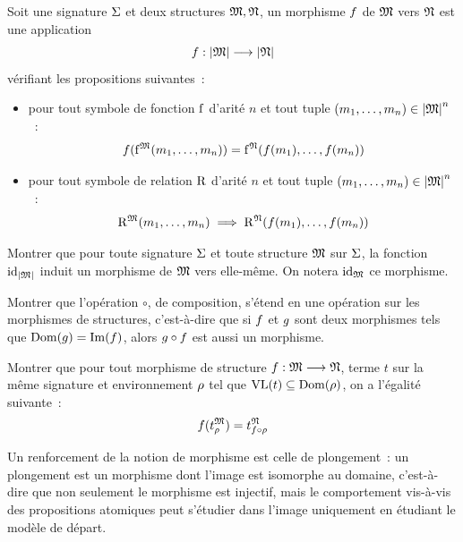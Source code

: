 \begin{definition}
  Soit une signature $\Sigma$ et deux structures $\mathfrak{M},\mathfrak{N}$, un
  morphisme $f$ de $\mathfrak{M}$ vers $\mathfrak{N}$ est une application
  \[f : \displaystyle \left\vert \mathfrak{M}\right\vert \longrightarrow \left\vert \mathfrak{N}\right\vert\]
  vérifiant les propositions suivantes~:
  \begin{itemize}
  \item pour tout symbole de fonction $\mathrm{f}$ d'arité $n$ et tout tuple
    $(m_1,\ldots,m_n)\in\left\vert \mathfrak{M}\right\vert^n$~:
    \[f(\mathrm{f}^{\mathfrak{M}}(m_1,\ldots,m_n))
    = \mathrm{f}^{\mathfrak{N}}(f(m_1),\ldots,f(m_n))\]
  \item pour tout symbole de relation $\mathrm{R}$ d'arité $n$ et tout tuple
    $(m_1,\ldots,m_n)\in\left\vert \mathfrak{M}\right\vert^n$~:
    \[\mathrm{R}^{\mathfrak{M}}(m_1,\ldots,m_n) \implies
    \mathrm{R}^{\mathfrak{N}}(f(m_1),\ldots,f(m_n)) \]
  \end{itemize}
\end{definition}

\begin{exercise}
  Montrer que pour toute signature $\Sigma$ et toute structure $\mathfrak{M}$ sur
  $\Sigma$, la fonction $\operatorname{id}_{\left\vert \mathfrak{M}\right\vert}$ induit un morphisme de $\mathfrak{M}$
  vers elle-même. On notera $\operatorname{id}_{\mathfrak{M}}$ ce morphisme.
\end{exercise}

\begin{exercise}
  Montrer que l'opération $\circ$, de composition, s'étend en une opération sur
  les morphismes de structures, c'est-à-dire que si $f$ et $g$
  sont deux morphismes tels que $\operatorname{Dom}(g) = \operatorname{Im}(f)$, alors
  $g\circ f$ est aussi un morphisme.
\end{exercise}

\begin{exercise}\label{pred.exo.morph.val}
  Montrer que pour tout morphisme de structure
  $f : \displaystyle \mathfrak{M} \longrightarrow \mathfrak{N}$, terme $t$ sur la même signature et
  environnement $\rho$ tel que $\operatorname{VL}(t) \subseteq \operatorname{Dom}(\rho)$, on a l'égalité
  suivante~:
  \[f(t^{\mathfrak{M}}_{\rho}) = t^{\mathfrak{N}}_{f\circ \rho}\]
\end{exercise}

Un renforcement de la notion de morphisme est celle de plongement~: un
plongement est un morphisme dont l'image est isomorphe au domaine, c'est-à-dire
que non seulement le morphisme est injectif, mais le comportement vis-à-vis
des propositions atomiques peut s'étudier dans l'image uniquement en étudiant le
modèle de départ.

